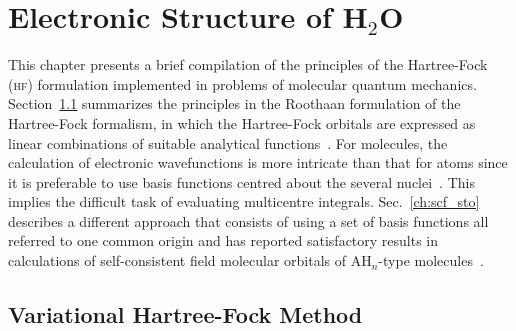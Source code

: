 
\chapter{Electronic Structure of H$_{2}$O}
\label{cha:scf_h2o}





This chapter presents a brief compilation of the principles of the
Hartree-Fock (\textsc{hf}) formulation implemented in problems of
molecular quantum mechanics. Section~\ref{ch:var_hf} summarizes the
principles in the Roothaan formulation of the Hartree-Fock formalism,
in which the Hartree-Fock orbitals are expressed as linear
combinations of suitable analytical functions~\cite{Roothaan_HF}. For
molecules, the calculation of electronic wavefunctions is more
intricate than that for atoms since it is preferable to use basis
functions centred about the several
nuclei~\cite{Pitzer_1968,Pitzer_1970}. This implies the difficult task
of evaluating multicentre integrals. Sec.~\ref{ch:scf_sto} describes a
different approach that consists of using a set of basis functions all
referred to one common origin and has reported satisfactory results in
calculations of self-consistent field molecular orbitals of
AH$_{n}$-type molecules~\cite{Moccia_JCP_2164, Moccia_1964}.


\section{Variational Hartree-Fock Method}
\label{ch:var_hf}






